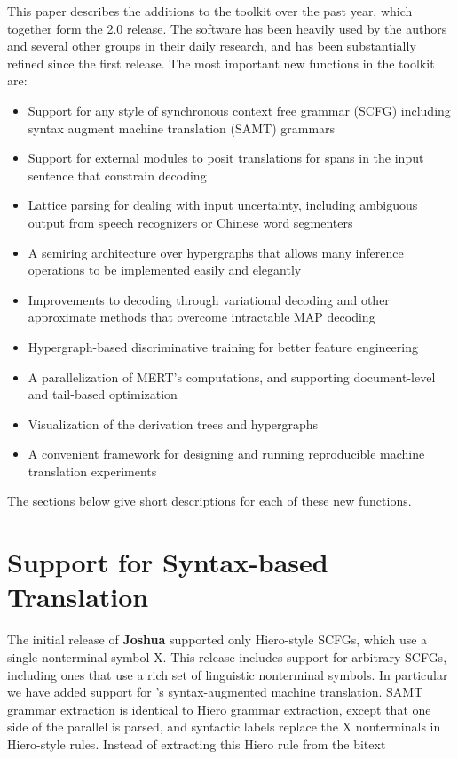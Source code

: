 \documentclass[11pt]{article}
\newcommand{\joshua}{\textbf{Joshua}\xspace}
\begin{document}
This paper describes the additions to the toolkit over the past year, which together form the 2.0 release. The software has been heavily used by the authors and several other groups in their daily research, and has been substantially refined since the first release.  The most important new functions in the toolkit are: 
\begin{itemize}
\item
Support for any style of synchronous context free grammar (SCFG)
including syntax augment machine translation (SAMT) grammars \cite{samt2006}
\item
Support for external modules to posit translations for spans in the input sentence that constrain decoding   \cite{PBML-2010-Joshua-modules}
\item
Lattice parsing for dealing with input uncertainty, including ambiguous output from speech recognizers or Chinese word segmenters  \cite{dyer-muresan-resnik:2008:ACLMain}
\item
A semiring architecture over hypergraphs that allows many inference operations to be implemented easily and elegantly \cite{li-eisner:2009:EMNLP}
\item
Improvements to decoding through variational decoding and other approximate methods that overcome intractable MAP decoding \cite{variational-decoding-acl09}
\item
Hypergraph-based discriminative training for better feature engineering \cite{zhifei-forest-reranking-galebook}
\item
A parallelization of MERT's computations, and supporting document-level and tail-based optimization \cite{atypical-mert}
\item
Visualization of the derivation trees and hypergraphs \cite{PBML-2010-Joshua-visualization}
\item
A convenient framework for designing and running reproducible machine translation experiments \cite{Schwartz-wmt10-pipline}
\end{itemize}
The sections below give short descriptions for each of these new functions.


\section{Support for Syntax-based Translation}

The initial release of \joshua supported only Hiero-style SCFGs, which use a single nonterminal symbol X.  This release includes support for arbitrary SCFGs, including ones that use a rich set of linguistic nonterminal symbols.  
In particular we have added support for 's syntax-augmented machine
translation. SAMT grammar extraction is identical to Hiero grammar extraction, except that one side of the parallel is parsed, and syntactic labels replace the X
nonterminals in Hiero-style rules.  Instead of extracting this Hiero rule from the bitext
\end{document}
